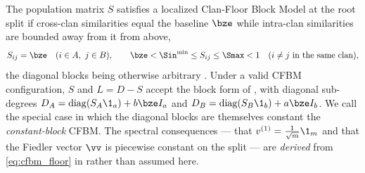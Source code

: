 \begin{assumption}\label{asm:cfbm}
The population matrix $S$ satisfies a localized Clan-Floor Block Model at the root
split if cross-clan similarities equal the baseline $\bze$ while intra-clan
similarities are bounded away from it from above,
\begin{equation}\label{eq:cfbm_floor}
   S_{ij}=\bze\quad(i\in A,\ j\in B),
   \qquad
   \bze<\Sin^{\min}\le S_{ij}\le\Smax<1\quad(i\ne j\ \text{in the same clan}),
\end{equation}
the diagonal blocks being otherwise arbitrary \cite{aizenbud2023spectral}. Under a
valid CFBM configuration, $S$ and $L=D-S$ accept the block form of
, with diagonal sub-degrees
$D_A=\operatorname{diag}(S_A\1_a)+b\bze I_a$ and
$D_B=\operatorname{diag}(S_B\1_b)+a\bze I_b$. We call the special case in which the
diagonal blocks are themselves constant the \emph{constant-block} CFBM. The spectral
consequences --- that $v^{(1)}=\tfrac1{\sqrt m}\1_m$ and that the Fiedler vector
$\vv$ is piecewise constant on the split --- are \emph{derived} from
\eqref{eq:cfbm_floor} in  rather than assumed here.
\end{assumption}

